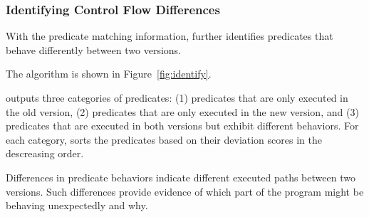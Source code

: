 


\subsubsection{Identifying Control Flow Differences}
\label{sec:identify_diff}

With the predicate matching information, \ourtool further
identifies predicates that behave differently
between two versions. 

The algorithm is shown in Figure~\ref{fig:identify}. \ourtool
{}

\ourtool outputs three categories of predicates:
(1) predicates that are only executed in the
old version, (2) predicates that are only executed
in the new version, and (3) predicates that
are executed in both versions but exhibit different
behaviors. For each category, \ourtool sorts the
predicates based on their deviation scores in the
descreasing order.


Differences in predicate behaviors indicate different executed paths
between two versions. Such differences provide evidence of
which part of the program might be behaving unexpectedly and why.


